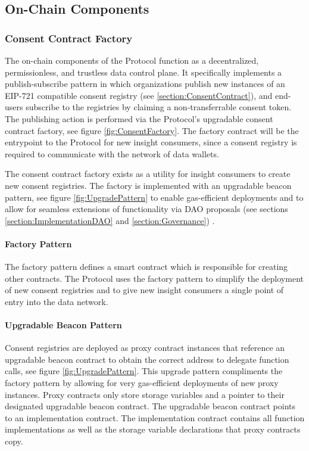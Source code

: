 \subsection{On-Chain Components}
\label{section:OnChain}

\subsubsection{Consent Contract Factory}
\label{section:ConsentFactory}


The on-chain components of the Protocol function as a decentralized, permissionless, and trustless data control plane. It specifically implements a publish-subscribe pattern
in which organizations publish new instances of an EIP-721 compatible consent registry (see \ref{section:ConsentContract}), and end-users 
subscribe to the registries by claiming a non-transferrable consent token. The publishing action is performed via the Protocol's upgradable 
consent contract factory, see figure \ref{fig:ConsentFactory}. The factory contract will be the entrypoint to the Protocol for new insight 
consumers, since a consent registry is required to communicate with the network of data wallets. 


The consent contract factory exists as a utility for insight consumers to create new consent registries. The factory is implemented with an 
upgradable beacon pattern, see figure \ref{fig:UpgradePattern} to enable gas-efficient deployments and to allow for seamless extensions of functionality
via DAO proposals (see sections \ref{section:ImplementationDAO} and \ref{section:Governance}) . 

\paragraph{Factory Pattern}
The factory pattern defines a smart contract which is responsible for creating other contracts. The Protocol uses the factory 
pattern to simplify the deployment of new consent registries and to give new insight consumers a single point of entry into the data network. 

\paragraph{Upgradable Beacon Pattern}
\label{section:BeaconPattern}

Consent registries are deployed as proxy contract instances that reference an upgradable beacon contract to obtain the correct address to delegate
function calls, see figure \ref{fig:UpgradePattern}. This upgrade pattern compliments the factory pattern by allowing for very gas-efficient deployments 
of new proxy instances. Proxy contracts only store storage variables and a pointer to their designated upgradable beacon contract. The upgradable 
beacon contract points to an implementation contract. The implementation contract contains all function implementations as well as the storage
variable declarations that proxy contracts copy. 

